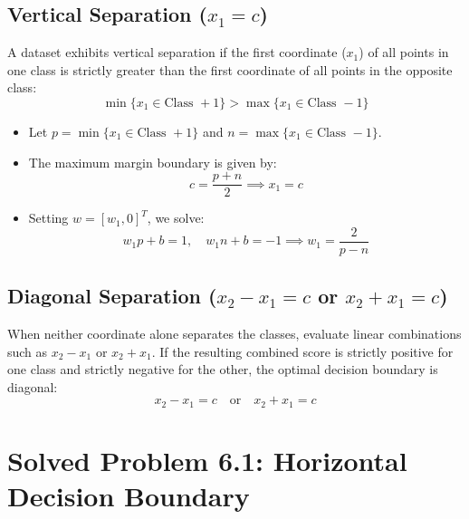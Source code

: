 \subsection{Vertical Separation (\texorpdfstring{$x_1 = c$}{x1 = c})}
A dataset exhibits vertical separation if the first coordinate ($x_1$) of all points in one class is strictly greater than the first coordinate of all points in the opposite class:
\begin{equation}
\min\{x_1 \in \text{Class } +1\} > \max\{x_1 \in \text{Class } -1\}
\end{equation}
\begin{itemize}
    \item Let $p = \min\{x_1 \in \text{Class } +1\}$ and $n = \max\{x_1 \in \text{Class } -1\}$.
    \item The maximum margin boundary is given by:
    \begin{equation}
    c = \frac{p + n}{2} \implies x_1 = c
    \end{equation}
    \item Setting $w = [w_1, 0]^T$, we solve:
    \begin{equation}
    w_1 p + b = 1, \quad w_1 n + b = -1 \implies w_1 = \frac{2}{p - n}
    \end{equation}
\end{itemize}

\subsection{Diagonal Separation (\texorpdfstring{$x_2 - x_1 = c$ or $x_2 + x_1 = c$}{x2 - x1 = c or x2 + x1 = c})}
When neither coordinate alone separates the classes, evaluate linear combinations such as $x_2 - x_1$ or $x_2 + x_1$. If the resulting combined score is strictly positive for one class and strictly negative for the other, the optimal decision boundary is diagonal:
\begin{equation}
x_2 - x_1 = c \quad \text{or} \quad x_2 + x_1 = c
\end{equation}

\section{Solved Problem 6.1: Horizontal Decision Boundary}

